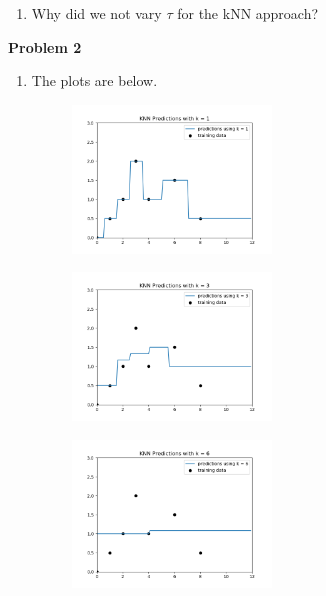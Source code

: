 \documentclass[submit]{harvardml}
\begin{document}
\begin{problem}
\begin{enumerate}
\item Why did we not vary $\tau$ for the kNN approach?

\end{enumerate}

\end{problem}

\newpage
\textbf{Problem 2}
\begin{enumerate}
    \item The plots are below.
    \begin{figure} [h!]
        \centering
        \includegraphics[width=0.5\textwidth]{HW1/ps1-p2-1.png}
        \label{fig:my_label}
    \end{figure}
        \begin{figure} [h!]
        \centering
        \includegraphics[width=0.5\textwidth]{HW1/ps1-p2-2.png}
        \label{fig:my_label}
    \end{figure}
    \begin{figure} [h!]
        \centering
        \includegraphics[width=0.5\textwidth]{HW1/ps1-p2-3.png}
        \label{fig:my_label}
    \end{figure}


\end{enumerate}
\end{document}
